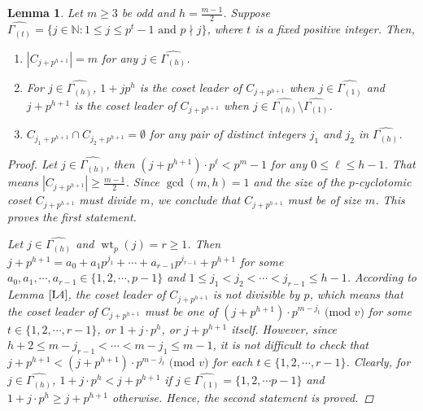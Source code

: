 \documentclass[pdflatex,sn-mathphys-num]{sn-jnl}%
\newtheorem{lemma}{Lemma}
\theoremstyle{thmstyleone}%
\theoremstyle{thmstyletwo}%
\theoremstyle{thmstylethree}%
\begin{document}
\vspace{1mm}
\begin{lemma}\label{L18}
    Let $m\geq 3$ be odd and $h=\frac{m-1}{2}$. Suppose $\widehat{\Gamma_{(t)}}=\{j\in\mathbb{N}:1\leq j\leq p^{t}-1\text{ and }p\nmid j\}$, where $t$ is a fixed positive integer. Then,
    \begin{enumerate}
        \item[$1.$] $|C_{j+p^{h+1}}|=m$ for any $j\in\widehat{\Gamma_{(h)}}$. 
        \item[$2.$] For $j\in\widehat{\Gamma_{(h)}}$, $1+jp^{h}$ is the coset leader of $C_{j+p^{h+1}}$ when $j\in\widehat{\Gamma_{(1)}}$ and $j+p^{h+1}$ is the coset leader of $C_{j+p^{h+1}}$ when $j\in\widehat{\Gamma_{(h)}}\setminus\widehat{\Gamma_{(1)}}$. 
        \item[$3.$] $C_{j_{1}+p^{h+1}}\cap C_{j_{2}+p^{h+1}}=\emptyset$ for any pair of distinct integers $j_{1}$ and $j_{2}$ in $\widehat{\Gamma_{(h)}}$. 
    \end{enumerate}
    \begin{proof}
        Let $j\in\widehat{\Gamma_{(h)}}$, then $(j+p^{h+1})\cdot p^{\ell}<p^m-1$ for any $0\leq \ell\leq h-1$. That means $|C_{j+p^{h+1}}|\geq\frac{m-1}{2}$. Since $\operatorname{gcd}(m,h)=1$ and the size of the $p$-cyclotomic coset $C_{j+p^{h+1}}$ must divide $m$, we conclude that $C_{j+p^{h+1}}$ must be of size $m$. This proves the first statement.
        \par Let $j\in\widehat{\Gamma_{(h)}}$ and $\operatorname{wt}_{p}(j)=r\geq 1$. Then $j+p^{h+1}=a_{0}+a_{1}p^{j_{1}}+\cdots+a_{r-1}p^{j_{r-1}}+p^{h+1}$ for some $a_{0},a_{1},\cdots,a_{r-1}\in\{1,2,\cdots,p-1\}$ and $1\leq j_{1}<j_{2}<\cdots<j_{r-1}\leq h-1$. According to Lemma $\ref{L4}$, the coset leader of  $C_{j+p^{h+1}}$ is not divisible by $p$, which means that the coset leader of  $C_{j+p^{h+1}}$ must be one of  $(j+p^{h+1})\cdot p^{m-j_{t}}\text{ (mod $v$)}$ for some $t\in\{1,2,\cdots,r-1\}$, or $1+j\cdot p^{h}$, or $j+p^{h+1}$ itself. However, since $h+2\leq m-j_{r-1}<\cdots<m-j_{1}\leq m-1$, it is not difficult to check that $j+p^{h+1}<(j+p^{h+1})\cdot p^{m-j_{t}}\text{ (mod $v$)}$ for each $t\in\{1,2,\cdots,r-1\}$. Clearly, for $j\in\widehat{\Gamma_{(h)}}$, $1+j\cdot p^h<j+p^{h+1}$ if $j\in\widehat{\Gamma_{(1)}}=\{1,2,\cdots p-1\}$ and $1+j\cdot p^h\geq j+p^{h+1}$ otherwise. Hence, the second statement is proved.

\end{proof}
\end{lemma}
\end{document}
